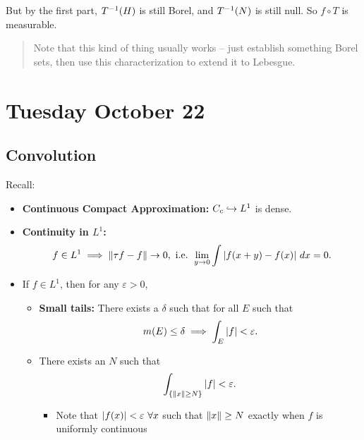 But by the first part, \(T^{-1}(H)\) is still Borel, and \(T^{-1}(N)\) is
still null. So \(f\circ T\) is measurable.

\begin{quote}
Note that this kind of thing usually works -- just establish something
Borel sets, then use this characterization to extend it to Lebesgue.
\end{quote}

\hypertarget{tuesday-october-22}{%
\section{Tuesday October 22}\label{tuesday-october-22}}

\hypertarget{convolution}{%
\subsection{Convolution}\label{convolution}}

Recall:

\begin{itemize}
\item
  \textbf{Continuous Compact Approximation:} \(C_c \hookrightarrow L^1\) is
  dense.
\item
  \textbf{Continuity in \(L^1\):}\\
  \begin{align*}
  f\in L^1 \implies {\left\lVert {\tau f - f} \right\rVert} \to 0, \text{ i.e. } \lim_{y\to 0} \int {\left\lvert {f(x+y) - f(x)} \right\rvert} ~dx = 0
  .\end{align*}
\item
  If \(f\in L^1\), then for any \(\varepsilon > 0\),

  \begin{itemize}
  \item
    \textbf{Small tails:} There exists a \(\delta\) such that for all
    \(E\) such that
    \begin{align*}
    m(E) \leq \delta \implies \int_E {\left\lvert {f} \right\rvert} < \varepsilon
    .\end{align*}
  \item
    There exists an \(N\) such that
    \begin{align*}
    \int_{\left\{{{\left\lVert {x} \right\rVert} \geq N}\right\}} {\left\lvert {f} \right\rvert} < \varepsilon
    .\end{align*}

    \begin{itemize}
    \tightlist
    \item
      Note that \({\left\lvert {f(x)} \right\rvert} < \varepsilon ~~\forall x\) such that
      \({\left\lVert {x} \right\rVert} \geq N\) exactly when \(f\) is uniformly continuous
    \end{itemize}
  \end{itemize}
\end{itemize}

